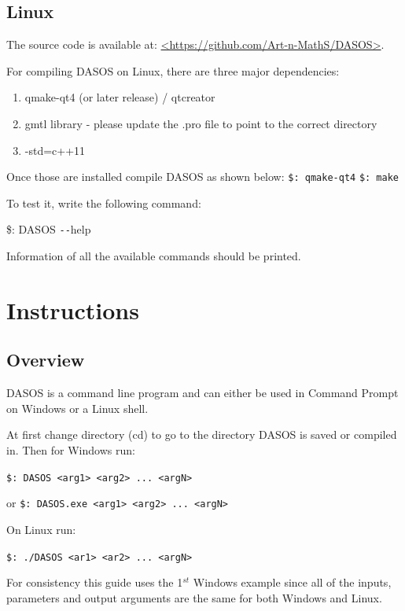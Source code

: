 \documentclass{article}
\begin{document}
		\subsection {Linux}
		\par The source code is available at: \url{<https://github.com/Art-n-MathS/DASOS>}.
		\par For compiling DASOS on Linux, there are three major dependencies: 
		\begin{enumerate}
		\item qmake-qt4 (or later release) / qtcreator 
		\item gmtl library - please update the .pro file to point to the correct directory
		\item -std=c++11
		\end{enumerate}
        \par Once those are installed compile DASOS as shown below: \newline
        \verb|$: qmake-qt4| \newline
        \verb|$: make| \newline		

        \par To test it, write the following command: 
        \par \$: DASOS \texttt{-{}-}help  
        \par Information of all the available commands should be printed. 
        

	\section{Instructions}\label{instructions}
	\subsection{Overview}\label{Overview}
	\par DASOS is a command line program and can either be used in Command Prompt on Windows or a Linux shell. 
	\par At first change directory (cd) to go to the directory DASOS is saved or compiled in. 
	Then for Windows run: 
	\par \verb|$: DASOS <arg1> <arg2> ... <argN>|
	\par or \verb|$: DASOS.exe <arg1> <arg2> ... <argN>|
	\par On Linux run:
	\par \verb|$: ./DASOS <ar1> <ar2> ... <argN>|
	\par For consistency this guide uses the 1$^{st}$ Windows example since all of the inputs, parameters and output arguments are the same for both Windows and Linux. 
	
\end{document}
